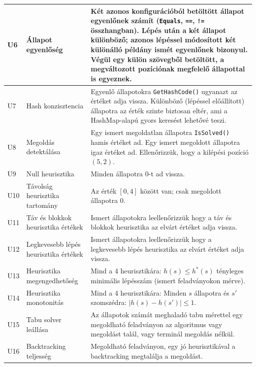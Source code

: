 \begin{center}
\begin{longtable}{ | p{} | p{} | p{} | }
U6
& Állapot egyenlőség
& Két azonos konfigurációból betöltött állapot egyenlőnek számít (\texttt{Equals}, \texttt{==}, \texttt{!=} összhangban). Lépés után a két állapot különböző; azonos lépéssel módosított két különálló példány ismét egyenlőnek bizonyul. Végül egy külön szövegből betöltött, a megváltozott pozíciónak megfelelő állapottal is egyeznek.
\\ \hline

U7
& Hash konzisztencia
& Egyenlő állapotokra \texttt{GetHashCode()} ugyanazt az értéket adja vissza. Különböző (lépéssel előállított) állapotra az érték szinte biztosan eltér, ami a HashMap-alapú gyors keresést lehetővé teszi.
\\ \hline

U8
& Megoldás detektálása
& Egy ismert megoldatlan állapotra \texttt{IsSolved()} hamis értéket ad. Egy ismert megoldott állapotra igaz értéket ad. Ellenőrizzük, hogy a kilépési pozíció $(5,2)$.
\\ \hline

U9
& Null heurisztika
& Minden állapotra 0-t ad vissza.
\\ \hline

U10
& Távolság heurisztika tartomány
& Az érték $[0, 4]$ között van; csak megoldott állapotra 0.
\\ \hline

U11
& Táv és blokkok heurisztika értékek
& Ismert állapotokra leellenőrizzük hogy a táv és blokkok heurisztika az elvárt értéket adja vissza. 
\\ \hline

U12
& Legkevesebb lépés heurisztika értékek
& Ismert állapotokra leellenőrizzük hogy a legkevesebb lépés heurisztika az elvárt értéket adja vissza. 
\\ \hline

U13
& Heurisztika megengedhetőség
& Mind a 4 heurisztikára: $h(s) \leq h^*(s)$ tényleges minimális lépésszám (ismert feladványokon mérve).
\\ \hline

U14
& Heurisztika monotonitás
& Mind a 4 heurisztikára: Minden $s$ állapotra és $s'$ szomszédra: $| h(s) - h(s') | \leq 1$.
\\ \hline

U15
& Tabu solver leállása
& Az állapotok számát meghaladó tabu mérettel egy megoldható feladványon az algoritmus vagy megoldást talál, vagy terminál megoldás nélkül.
\\ \hline

U16
& Backtracking teljesség
& Megoldható feladványon, egy jó heurisztikával a backtracking megtalálja a megoldást.
\\ \hline


\end{longtable}
\end{center}
